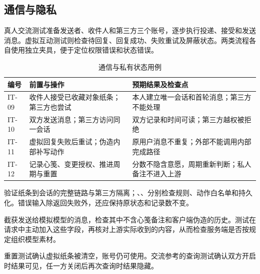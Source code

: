 \subsection*{通信与隐私}
真人交流测试准备发送者、收件人和第三方三个账号，逐步执行投递、接受和发送消息。虚拟互动测试则检查待回复、回复成功、失败重试及屏蔽状态。两类流程各自使用独立夹具，便于定位权限错误和状态错误。

\begin{table}[H]\centering\small
\caption{通信与私有状态用例}
\begin{tabularx}{\linewidth}{@{}p{15mm}p{38mm}X@{}}\toprule
编号 & 前置与操作 & 预期结果及检查点 \\ \midrule
IT-09 & 收件人接受已收藏对象纸条；第三方也尝试 & 本人建立唯一会话和首轮消息；第三方不能处理 \\
IT-10 & 双方发送消息；第三方访问同一会话 & 双方记录和时间可读；第三方越权被拒绝 \\
IT-11 & 虚拟回复失败后重试；伪造内部补写动作 & 原用户消息不重复；外部不能调用内部完成路径 \\
IT-12 & 记录心笺、变更授权、推进周期与重置 & 分数不隐含意愿，周期重新判断；私人备注不进入上游 \\ \bottomrule
\end{tabularx}\end{table}

验证纸条到会话的完整链路与第三方隔离；、、分别检查规则、动作白名单和持久化。错误输入除返回失败外，还应保持原状态和记录数不变。

截获发送给模拟模型的消息，检查其中不含心笺备注和客户端伪造的历史。测试在请求中主动加入这些字段，再核对上游实际收到的内容，从而检查服务端是否按规定组织模型素材。

重置测试确认虚拟纸条被清空，账号仍可使用。交流参考的查询测试确认双方开启时结果可见，任一方关闭后再次查询时结果隐藏。
